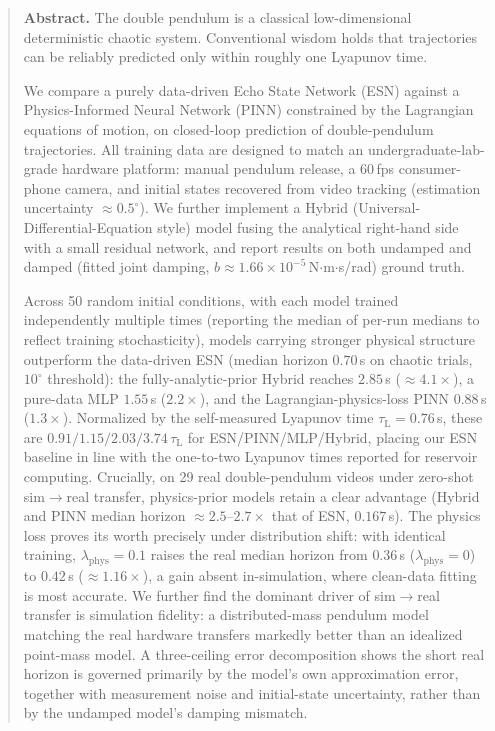 \documentclass[a4paper,12pt]{ctexart}   %
\newcommand{\tauL}{\tau_{\mathrm{L}}}              %
\begin{document}
\begin{abstract}
{\setlength{\parindent}{0pt}\setlength{\parskip}{0.8em}
\textbf{Abstract.} The double pendulum is a classical low-dimensional
deterministic chaotic system. Conventional wisdom holds that trajectories can be reliably
predicted only within roughly one Lyapunov time.

We compare a purely data-driven Echo State Network (ESN)
against a Physics-Informed Neural Network (PINN) constrained by the Lagrangian equations of
motion, on closed-loop prediction of double-pendulum trajectories. All training data are
designed to match an undergraduate-lab-grade hardware platform:
manual pendulum release, a 60\,fps consumer-phone camera, and initial states recovered from
video tracking (estimation uncertainty $\approx 0.5^\circ$). We further implement a Hybrid (Universal-Differential-Equation
style) model fusing the analytical right-hand side with a small residual network, and report
results on both undamped and damped (fitted joint damping, $b \approx 1.66\times10^{-5}$\,N$\cdot$m$\cdot$s/rad) ground truth.

Across 50 random initial conditions, with each model trained
independently multiple times (reporting the median of per-run medians to reflect training
stochasticity), models carrying stronger physical structure outperform the data-driven ESN
(median horizon $0.70$\,s on chaotic trials, $10^\circ$ threshold): the fully-analytic-prior
Hybrid reaches $2.85$\,s ($\approx 4.1\times$), a pure-data MLP $1.55$\,s ($2.2\times$), and the
Lagrangian-physics-loss PINN $0.88$\,s ($1.3\times$). Normalized by the self-measured Lyapunov
time $\tauL = 0.76$\,s, these are $0.91/1.15/2.03/3.74\,\tauL$ for ESN/PINN/MLP/Hybrid, placing
our ESN baseline in line with the one-to-two Lyapunov times reported for reservoir computing.
Crucially, on 29 real double-pendulum videos under zero-shot sim$\to$real transfer,
physics-prior models retain a clear advantage (Hybrid and PINN median horizon
$\approx 2.5\text{--}2.7\times$ that of ESN, $0.167$\,s). The physics loss proves its worth
precisely under distribution shift: with identical training, $\lambda_{\mathrm{phys}}=0.1$
raises the real median horizon from $0.36$\,s ($\lambda_{\mathrm{phys}}=0$) to $0.42$\,s
($\approx 1.16\times$), a gain absent in-simulation, where clean-data fitting is most accurate.
We further find the dominant driver of sim$\to$real transfer is simulation fidelity: a
distributed-mass pendulum model matching the real hardware transfers markedly better than an
idealized point-mass model. A three-ceiling error decomposition shows the short real horizon is
governed primarily by the model's own approximation error, together with measurement noise and
initial-state uncertainty, rather than by the undamped model's damping mismatch.

}
\end{abstract}
\end{document}
